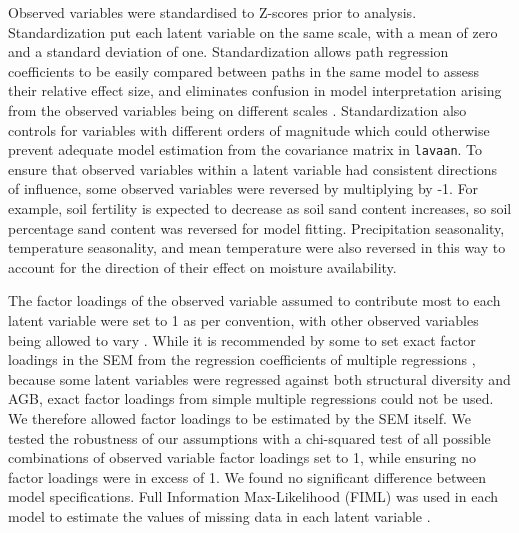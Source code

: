 \documentclass[11pt,a4paper]{article}
\begin{document}
Observed variables were standardised to Z-scores prior to analysis. Standardization put each latent variable on the same scale, with a mean of zero and a standard deviation of one. Standardization allows path regression coefficients to be easily compared between paths in the same model to assess their relative effect size, and eliminates confusion in model interpretation arising from the observed variables being on different scales \citep{Beaujean2014}. Standardization also controls for variables with different orders of magnitude which could otherwise prevent adequate model estimation from the covariance matrix in \verb|lavaan|. To ensure that observed variables within a latent variable had consistent directions of influence, some observed variables were reversed by multiplying by -1. For example, soil fertility is expected to decrease as soil sand content increases, so soil percentage sand content was reversed for model fitting. Precipitation seasonality, temperature seasonality, and mean temperature were also reversed in this way to account for the direction of their effect on moisture availability.

The factor loadings of the observed variable assumed to contribute most to each latent variable were set to 1 as per convention, with other observed variables being allowed to vary \citep{Beaujean2014}. While it is recommended by some to set exact factor loadings in the SEM from the regression coefficients of multiple regressions \citep{lavaan}, because some latent variables were regressed against both structural diversity and AGB, exact factor loadings from simple multiple regressions could not be used. We therefore allowed factor loadings to be estimated by the SEM itself. We tested the robustness of our assumptions with a chi-squared test of all possible combinations of observed variable factor loadings set to 1, while ensuring no factor loadings were in excess of 1. We found no significant difference between model specifications. Full Information Max-Likelihood (FIML) was used in each model to estimate the values of missing data in each latent variable \citep{Cham2017}.
\end{document}
